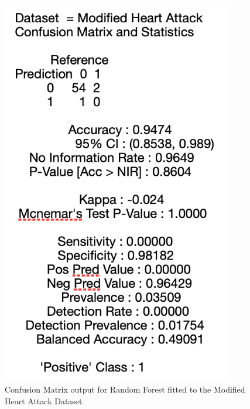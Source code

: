 \begin{figure}[!htbp]
    \centering
    \begin{minipage}{0.45\textwidth}
        \centering
        \includegraphics[width=0.9\textwidth]{ThesisTemplate/appendix/images/Chapter5Appendix/ConfusionMatrix/modHeartAttack.png} 
        \caption{Confusion Matrix output for Random Forest fitted to the Modified Heart Attack Dataset}
        \label{fig:my_label}
    \end{minipage}\hfill
    \begin{minipage}{0.45\textwidth}
        \centering

\end{minipage}
\end{figure}
